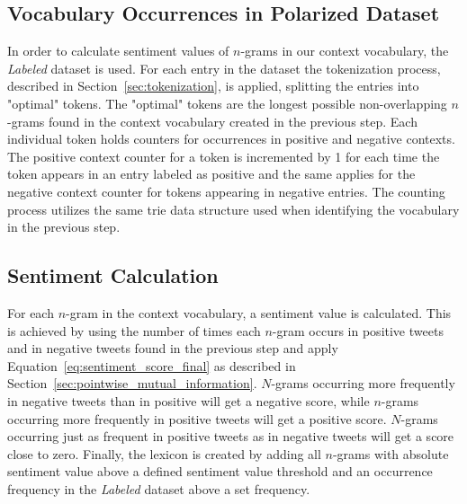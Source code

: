 \subsection*{Vocabulary Occurrences in Polarized Dataset}
In order to calculate sentiment values of $n$-grams in our context vocabulary, the \textit{Labeled} dataset is used. For each entry in the dataset the tokenization process, described in Section~\ref{sec:tokenization}, is applied, splitting the entries into "optimal" tokens. The "optimal" tokens are the longest possible non-overlapping $n$-grams found in the context vocabulary created in the previous step. Each individual token holds counters for occurrences in positive and negative contexts. The positive context counter for a token is incremented by 1 for each time the token appears in an entry labeled as positive and the same applies for the negative context counter for tokens appearing in negative entries. The counting process utilizes the same trie data structure used when identifying the vocabulary in the previous step.


\subsection*{Sentiment Calculation}
For each $n$-gram in the context vocabulary, a sentiment value is calculated. This is achieved by using the number of times each $n$-gram occurs in positive tweets and in negative tweets found in the previous step and apply Equation~\ref{eq:sentiment_score_final} as described in Section~\ref{sec:pointwise_mutual_information}. $N$-grams occurring more frequently in negative tweets than in positive will get a negative score, while $n$-grams occurring more frequently in positive tweets will get a positive score. $N$-grams occurring just as frequent in positive tweets as in negative tweets will get a score close to zero. Finally, the lexicon is created by adding all $n$-grams with absolute sentiment value above a defined sentiment value threshold and an occurrence frequency in the \textit{Labeled} dataset above a set frequency.


